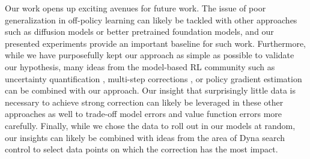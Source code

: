 Our work opens up exciting avenues for future work.
The issue of poor generalization in off-policy learning can likely be tackled with other approaches such as diffusion models \parencite{lu2024synthetic} or better pretrained foundation models, and our presented experiments provide an important baseline for such work.
Furthermore, while we have purposefully kept our approach as simple as possible to validate our hypothesis, many ideas from the model-based RL community such as uncertainty quantification \parencite{pets,talvitie2024bounding}, multi-step corrections \parencite{buckman2018sample,hafner2020dream}, or policy gradient estimation \parencite{amos2021model} can be combined with our approach.
Our insight that surprisingly little data is necessary to achieve strong correction can likely be leveraged in these other approaches as well to trade-off model errors and value function errors more carefully.
Finally, while we chose the data to roll out in our models at random, our insights can likely be combined with ideas from the area of Dyna search control \parencite{pan2019hill,pan2020frequency} to select data points on which the correction has the most impact.
